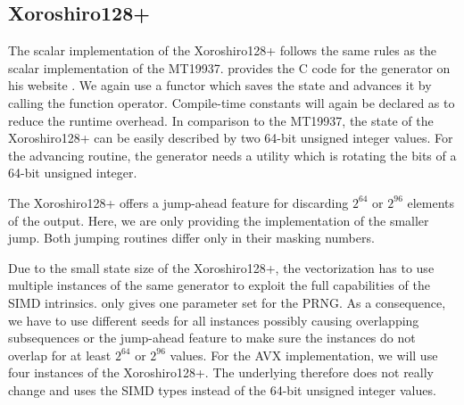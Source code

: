 \documentclass{stdlocal}
\begin{document}

  \subsection{Xoroshiro128+} %
  \label{sub:xoroshiro}
    The scalar implementation of the Xoroshiro128+ follows the same rules as the scalar implementation of the MT19937.
    \citeauthor{vigna-xoroshiro} provides the C code for the generator on his website \autocite{vigna-xoroshiro}.
    We again use a functor which saves the state and advances it by calling the function operator.
    Compile-time constants will again be declared as  to reduce the runtime overhead.
    In comparison to the MT19937, the state of the Xoroshiro128+ can be easily described by two 64-bit unsigned integer values.
    For the advancing routine, the generator needs a utility which is rotating the bits of a 64-bit unsigned integer.

    The Xoroshiro128+ offers a jump-ahead feature for discarding $2^{64}$ or $2^{96}$ elements of the output.
    Here, we are only providing the implementation of the smaller jump.
    Both jumping routines differ only in their masking numbers.


    Due to the small state size of the Xoroshiro128+, the vectorization has to use multiple instances of the same generator to exploit the full capabilities of the SIMD intrinsics.
    \citeauthor{vigna-xoroshiro} only gives one parameter set for the PRNG.
    As a consequence, we have to use different seeds for all instances possibly causing overlapping subsequences or the jump-ahead feature to make sure the instances do not overlap for at least $2^{64}$ or $2^{96}$ values.
    For the AVX implementation, we will use four instances of the Xoroshiro128+.
    The underlying therefore does not really change and uses the SIMD types instead of the 64-bit unsigned integer values.
\end{document}
